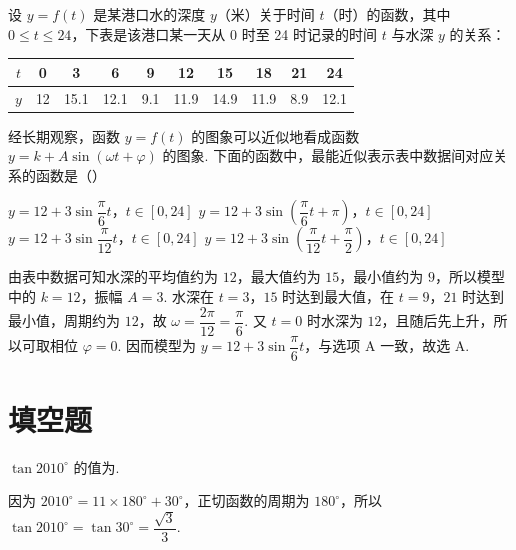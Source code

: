 \begin{problem}
设 \(y=f(t)\) 是某港口水的深度 \(y\)（米）关于时间 \(t\)（时）的函数，其中 \(0\leqslant t\leqslant 24\)，下表是该港口某一天从 0 时至 24 时记录的时间 \(t\) 与水深 \(y\) 的关系：

\begin{center}
\begin{tabular}{|c|c|c|c|c|c|c|c|c|c|}
\hline
\(t\) & 0 & 3 & 6 & 9 & 12 & 15 & 18 & 21 & 24 \\
\hline
\(y\) & 12 & 15.1 & 12.1 & 9.1 & 11.9 & 14.9 & 11.9 & 8.9 & 12.1 \\
\hline
\end{tabular}
\end{center}

经长期观察，函数 \(y=f(t)\) 的图象可以近似地看成函数 \(y=k+A\sin\left(\omega t+\varphi\right)\) 的图象. 下面的函数中，最能近似表示表中数据间对应关系的函数是（\quad）

\choices
    {\(y=12+3\sin\dfrac{\pi}{6}t\)，\(t\in\left[0,24\right]\)}
    {\(y=12+3\sin\left(\dfrac{\pi}{6}t+\pi\right)\)，\(t\in\left[0,24\right]\)}
    {\(y=12+3\sin\dfrac{\pi}{12}t\)，\(t\in\left[0,24\right]\)}
    {\(y=12+3\sin\left(\dfrac{\pi}{12}t+\dfrac{\pi}{2}\right)\)，\(t\in\left[0,24\right]\)}
\end{problem}

\begin{solution}
由表中数据可知水深的平均值约为 \(12\)，最大值约为 \(15\)，最小值约为 \(9\)，所以模型中的 \(k=12\)，振幅 \(A=3\). 水深在 \(t=3\)，\(15\) 时达到最大值，在 \(t=9\)，\(21\) 时达到最小值，周期约为 \(12\)，故
\(\omega=\dfrac{2\pi}{12}=\dfrac{\pi}{6}\).
又 \(t=0\) 时水深为 \(12\)，且随后先上升，所以可取相位 \(\varphi=0\). 因而模型为
\(y=12+3\sin\dfrac{\pi}{6}t\)，与选项 A 一致，故选 A.
\end{solution}

\section{填空题}
\begin{problem}
\(\tan 2010^\circ\) 的值为\fillinblank{}.
\end{problem}

\begin{solution}
因为 \(2010^\circ=11\times180^\circ+30^\circ\)，正切函数的周期为 \(180^\circ\)，所以
\(\tan2010^\circ=\tan30^\circ=\dfrac{\sqrt{3}}{3}\).
\end{solution}

